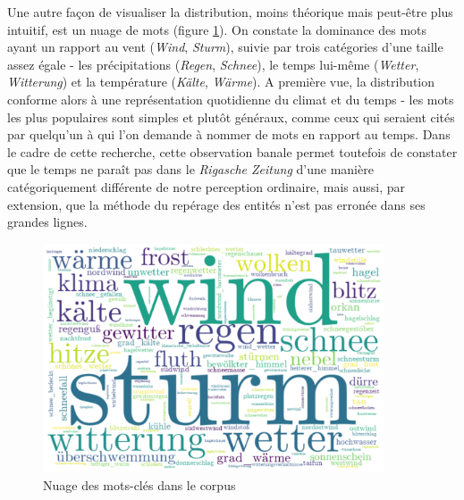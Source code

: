 \documentclass[a4paper,twoside,12pt]{article}
\begin{document}
Une autre façon de visualiser la distribution, moins théorique mais peut-être plus intuitif, est un nuage de mots (figure \ref{fig:wordcloud}). On constate la dominance des mots ayant un rapport au vent (\textit{Wind}, \textit{Sturm}), suivie par trois catégories d'une taille assez égale - les précipitations (\textit{Regen}, \textit{Schnee}), le \og temps \fg{} lui-même (\textit{Wetter}, \textit{Witterung}) et la température (\textit{Kälte}, \textit{Wärme}). A première vue, la distribution conforme alors à une représentation quotidienne du climat et du temps - les mots les plus populaires sont simples et plutôt généraux, comme ceux qui seraient cités par quelqu'un à qui l'on demande à nommer de mots en rapport au temps. Dans le cadre de cette recherche, cette observation banale permet toutefois de constater que le temps ne paraît pas dans le \textit{Rigasche Zeitung} d'une manière catégoriquement différente de notre perception ordinaire, mais aussi, par extension, que la méthode du repérage des entités n'est pas erronée dans ses grandes lignes. %

\begin{figure}[h]
    \centering
    \includegraphics[width=0.9\textwidth]{images/wordcloud_general.pdf}
    \caption{Nuage des mots-clés dans le corpus}
    \label{fig:wordcloud}
\end{figure}
\end{document}
